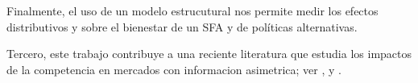 \documentclass[11pt]{article}
\theoremstyle{plain}
\theoremstyle{plain}
\begin{document}
Finalmente, el uso de un modelo estrucutural nos permite medir los efectos distributivos y sobre el bienestar de un SFA y de políticas alternativas.


Tercero, este trabajo contribuye a una reciente literatura que estudia los impactos de la competencia en mercados con informacion asimetrica; ver \textcite{allen_search_2019}, \textcite{cuesta_price_2018} y \textcite{cosconati_competing_2025}. 



    \newpage
\end{document}
